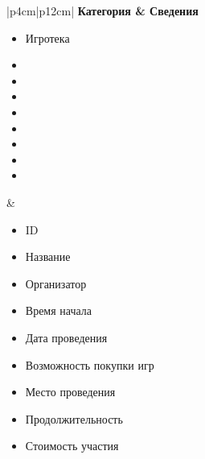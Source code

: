 \begin{table}[h!]
    \begin{center}
    \begin{threeparttable}
        \captionsetup{format=hang,justification=raggedright,
                      singlelinecheck=off}
        \caption{\label{tab:01}Категории данных и сведения о них}
        \renewcommand{\arraystretch}{1.5}
        \begin{tabular}{|p{4cm}|p{12cm}|}
            \hline
            \bfseries Категория & \bfseries Сведения\\
            \hline
            \begin{minipage}[t]{\linewidth}
              \begin{multicols}{1}
                \begin{itemize}[labelsep=0mm,nosep,after=\strut]
                  \item[] Игротека
                  \item[]
                  \item[]
                  \item[]
                  \item[]
                  \item[]
                  \item[]
                  \item[]
                  \item[]
                \end{itemize}
              \end{multicols}
            \end{minipage}
          & \begin{minipage}[t]{\linewidth}
              \begin{multicols}{2}
                \begin{itemize}[labelsep=0mm,nosep,after=\strut]
                  \item[] ID
                  \item[] Название
                  \item[] Организатор
                  \item[] Время начала
                  \item[] Дата проведения
                  \item[] Возможность покупки игр
                  \item[] Место проведения
                  \item[] Продолжительность
                  \item[] Стоимость участия

\end{itemize}
\end{multicols}
\end{minipage}
\end{tabular}
\end{threeparttable}
\end{center}
\end{table}
